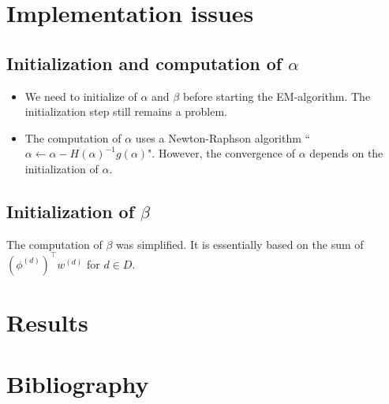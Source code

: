 \documentclass[10pt]{article}
\begin{document}
\section{Implementation issues}


\subsection{Initialization and computation of $\alpha$}

\begin{itemize}
\setlength\itemsep{-0.2em}
  \item We need to initialize of $\alpha$ and $\beta$ before starting the EM-algorithm. The initialization step still remains a problem.
  \item The computation of $\alpha$ uses a Newton-Raphson algorithm ``$\alpha \leftarrow \alpha - H(\alpha)^{-1}g(\alpha)$". However, the convergence of $\alpha$ depends on the initialization of $\alpha$.
\end{itemize}

\subsection{Initialization of $\beta$}

The computation of $\beta$ was simplified. It is essentially based on the sum of $(\phi^{(d)})^{\top}w^{(d)}$ for $d \in D$.

\section{Results}



\section{Bibliography}
\end{document}
